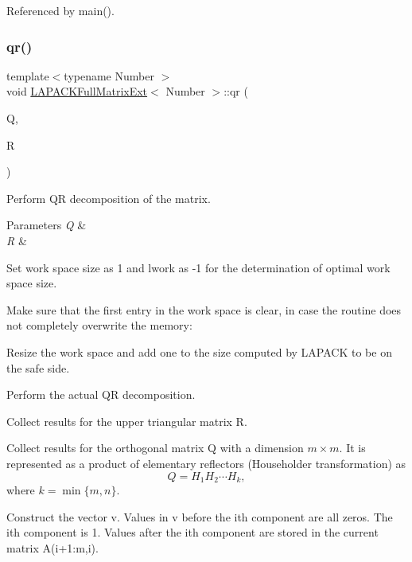 Referenced by main().

\mbox{\label{classLAPACKFullMatrixExt_a0413f3b6186f8e8fc0f2cb2e0cb5cc42}} 
\subsubsection{\texorpdfstring{qr()}{qr()}}
{\footnotesize\ttfamily template$<$typename Number $>$ \\
void \hyperlink{classLAPACKFullMatrixExt}{L\+A\+P\+A\+C\+K\+Full\+Matrix\+Ext}$<$ Number $>$\+::qr (\begin{DoxyParamCaption}\item[{\hyperlink{classLAPACKFullMatrixExt}{L\+A\+P\+A\+C\+K\+Full\+Matrix\+Ext}$<$ Number $>$ \&}]{Q,  }\item[{\hyperlink{classLAPACKFullMatrixExt}{L\+A\+P\+A\+C\+K\+Full\+Matrix\+Ext}$<$ Number $>$ \&}]{R }\end{DoxyParamCaption})}

Perform QR decomposition of the matrix. 
\begin{DoxyParams}{Parameters}
{\em Q} & \\
\hline
{\em R} & \\
\hline
\end{DoxyParams}
Set work space size as 1 and {\ttfamily lwork} as -\/1 for the determination of optimal work space size.

Make sure that the first entry in the work space is clear, in case the routine does not completely overwrite the memory\+:

Resize the work space and add one to the size computed by L\+A\+P\+A\+CK to be on the safe side.

Perform the actual QR decomposition.

Collect results for the upper triangular matrix {\ttfamily R}.

Collect results for the orthogonal matrix {\ttfamily Q} with a dimension $m \times m$. It is represented as a product of elementary reflectors (Householder transformation) as \[ Q = H_1 H_2 \cdots H_k, \] where $k = \min\{m, n\}$.

Construct the vector {\ttfamily v}. Values in {\ttfamily v} before the i\textquotesingle{}th component are all zeros. The i\textquotesingle{}th component is 1. Values after the i\textquotesingle{}th component are stored in the current matrix {\ttfamily A}(i+1\+:m,i).

